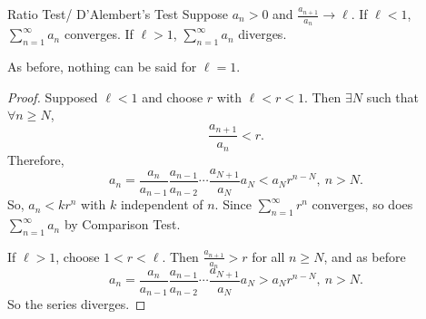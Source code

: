 \begin{theorem}{Ratio Test/ D'Alembert's Test}{}
    Suppose \(a_n > 0\) and \(\frac{a_{n+1}}{a_n}\to \ell\). If \(\ell<1\), \(\sum\limits_{n=1}^{\infty} a_n\) converges. If \(\ell > 1\), \(\sum\limits_{n=1}^{\infty} a_n\) diverges.
\end{theorem}
\begin{remark}
    As before, nothing can be said for \(\ell = 1\).
\end{remark}
\begin{proof}
    Supposed \(\ell < 1\) and choose \(r\) with \(\ell < r < 1\). Then \(\exists N \) such that \(\forall n \geq N\),
    \[
        \frac{a_{n+1}}{a_n} < r.
    \]
    Therefore,
    \[
        a_n = \frac{a_n}{a_{n-1}}\frac{a_{n-1}}{a_{n-2}}\cdots \frac{a_{N+1}}{a_N}a_N<a_N r^{n-N},~n>N.
    \]
    So, \(a_n < kr^n\) with \(k\) independent of \(n\). Since \(\sum\limits_{n=1}^{\infty} r^n\) converges, so does \(\sum\limits_{n=1}^{\infty} a_n\) by Comparison Test.

    If \(\ell > 1\), choose \(1<r<\ell\). Then \(\frac{a_{n+1}}{a_n}>r\) for all \(n \geq N\), and as before
    \[
        a_n = \frac{a_n}{a_{n-1}}\frac{a_{n-1}}{a_{n-2}}\cdots \frac{a_{N+1}}{a_N}a_N>a_N r^{n-N},~n>N.
    \]
    So the series diverges.
\end{proof}